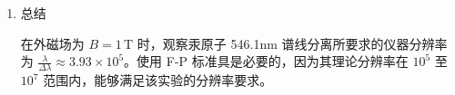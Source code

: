 \documentclass[dvipsnames, svgnames,a4paper,11pt]{article}
\begin{document}
\begin{enumerate}
		计算得：
		\[ \Delta \lambda \approx 1.39 \times 10^{-12} \, \text{m} = 1.39 \, \text{pm} \]
		
		仪器分辨率
		\[ \frac{\lambda}{\Delta \lambda} = \frac{546.1 \times 10^{-9}}{1.39 \times 10^{-12}} \approx 3.93 \times 10^5 \]
		
		讨论仪器选择
		\begin{itemize}
			\item 一般棱镜摄谱仪：理论分辨率为 \(10^3\) 至 \(10^4\)。
			\item F-P 标准具：理论分辨率为 \(10^5\) 至 \(10^7\)。
		\end{itemize}
		
		由于需要的仪器分辨率 \(\approx 3.93 \times 10^5\)，这远高于一般棱镜摄谱仪的理论分辨率范围。因此，使用 F-P 标准具是必要的，因为它具有足够高的分辨率来观察汞原子 546.1nm 谱线在外磁场中的分离现象。
		
		\item 总结
		
		在外磁场为 \(B = 1 \, \text{T}\) 时，观察汞原子 546.1nm 谱线分离所要求的仪器分辨率为 \(\frac{\lambda}{\Delta \lambda} \approx 3.93 \times 10^5\)。使用 F-P 标准具是必要的，因为其理论分辨率在 \(10^5\) 至 \(10^7\) 范围内，能够满足该实验的分辨率要求。
	\end{enumerate}		
	
\end{document}
